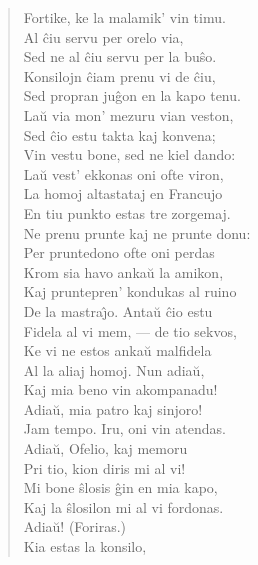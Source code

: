 \begin{verse}
                Fortike, ke la malamik' vin timu.\\
                Al \^ciu servu per orelo via,\\
                Sed ne al \^ciu servu per la bu\^so.\\
                Konsilojn \^ciam prenu vi de \^ciu,\\
                Sed propran ju\^gon en la kapo tenu.\\
                La\u u via mon' mezuru vian veston,\\
                Sed \^cio estu takta kaj konvena;\\
                Vin vestu bone, sed ne kiel dando:\\
                La\u u vest' ekkonas oni ofte viron,\\
                La homoj altastataj en Francujo\\
                En tiu punkto estas tre zorgemaj.\\
                Ne prenu prunte kaj ne prunte donu:\\
                Per pruntedono ofte oni perdas\\
                Krom sia havo anka\u u la amikon,\\
                Kaj pruntepren' kondukas al ruino\\
                De la mastra\^{\j}o. Anta\u u \^cio estu\\
                Fidela al vi mem, --- de tio sekvos,\\
                Ke vi ne estos anka\u u malfidela\\
                Al la aliaj homoj. Nun adia\u u,\\
                Kaj mia beno vin akompanadu!\\
 Adia\u u, mia patro kaj sinjoro!\\
 Jam tempo. Iru, oni vin atendas.\\
 Adia\u u, Ofelio, kaj memoru\\
                Pri tio, kion diris mi al vi!\\
 Mi bone \^slosis \^gin en mia kapo,\\
                Kaj la \^slosilon mi al vi fordonas.\\
Adia\u u! {\footnotesize(Foriras.)}\\
 Kia estas la konsilo,\\

\end{verse}
